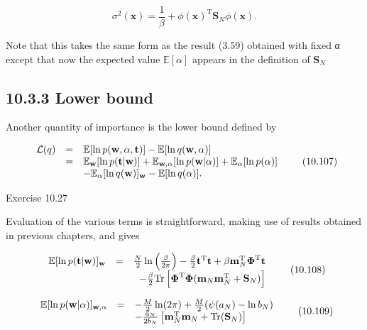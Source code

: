 \documentclass[
  10
]{article}
\begin{document}
\[
\sigma^ {2} (\mathbf {x}) = \frac {1}{\beta} + \phi (\mathbf {x}) ^ {\mathrm{T}} \mathbf {S} _ {N} \phi (\mathbf {x}).\tag{10.106}
\]

Note that this takes the same form as the result (3.59) obtained with
fixed α except that now the expected value \(\mathbb { E } [ \alpha ]\)
appears in the definition of \(\mathbf { S } _ { N }\)

\subsection{10.3.3 Lower bound}\label{lower-bound}

Another quantity of importance is the lower bound defined by

\[
\begin{array}{r c l} \mathcal {L} (q) & = & \mathbb {E} [ \ln p (\mathbf {w}, \alpha , \mathbf {t}) ] - \mathbb {E} [ \ln q (\mathbf {w}, \alpha) ] \\ & = & \mathbb {E} _ {\mathbf {w}} [ \ln p (\mathbf {t} | \mathbf {w}) ] + \mathbb {E} _ {\mathbf {w}, \alpha} [ \ln p (\mathbf {w} | \alpha) ] + \mathbb {E} _ {\alpha} [ \ln p (\alpha) ] \\ & & - \mathbb {E} _ {\alpha} [ \ln q (\mathbf {w}) ] _ {\mathbf {w}} - \mathbb {E} [ \ln q (\alpha) ]. \end{array}\tag{10.107}
\]

Exercise 10.27

Evaluation of the various terms is straightforward, making use of
results obtained in previous chapters, and gives

\[
\begin{array}{r l r} \mathbb {E} [ \ln p (\mathbf {t} | \mathbf {w}) ] _ {\mathbf {w}} & = & \frac {N}{2} \ln \left(\frac {\beta}{2 \pi}\right) - \frac {\beta}{2} \mathbf {t} ^ {\mathrm{T}} \mathbf {t} + \beta \mathbf {m} _ {N} ^ {\mathrm{T}} \boldsymbol {\Phi} ^ {\mathrm{T}} \mathbf {t} \\ & & - \frac {\beta}{2} \mathrm{Tr} \left[ \boldsymbol {\Phi} ^ {\mathrm{T}} \boldsymbol {\Phi} (\mathbf {m} _ {N} \mathbf {m} _ {N} ^ {\mathrm{T}} + \mathbf {S} _ {N}) \right] \end{array}\tag{10.108}
\]

\[
\begin{array}{r c l} \mathbb {E} [ \ln p (\mathbf {w} | \alpha) ] _ {\mathbf {w}, \alpha} & = & - \frac {M}{2} \ln (2 \pi) + \frac {M}{2} (\psi (a _ {N}) - \ln b _ {N}) \\ & & - \frac {a _ {N}}{2 b _ {N}} \left[ \mathbf {m} _ {N} ^ {\mathrm{T}} \mathbf {m} _ {N} + \operatorname{Tr} (\mathbf {S} _ {N}) \right] \end{array}\tag{10.109}
\]
\end{document}

